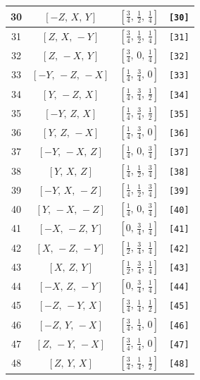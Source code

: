 \documentclass[fleqn,8pt]{jsarticle}
\begin{document}
\begin{longtable}{cccc}
30 & $\left[ - Z,\, X,\, Y \right]$ & $\left[ \frac{3}{4},\, \frac{1}{2},\, \frac{1}{4} \right]$ & {\tt [30]} \\ \hline
31 & $\left[ Z,\, X,\, - Y \right]$ & $\left[ \frac{3}{4},\, \frac{1}{2},\, \frac{1}{4} \right]$ & {\tt [31]} \\ \hline
32 & $\left[ Z,\, - X,\, Y \right]$ & $\left[ \frac{3}{4},\, 0,\, \frac{1}{4} \right]$ & {\tt [32]} \\ \hline
33 & $\left[ - Y,\, - Z,\, - X \right]$ & $\left[ \frac{1}{4},\, \frac{3}{4},\, 0 \right]$ & {\tt [33]} \\ \hline
34 & $\left[ Y,\, - Z,\, X \right]$ & $\left[ \frac{1}{4},\, \frac{3}{4},\, \frac{1}{2} \right]$ & {\tt [34]} \\ \hline
35 & $\left[ - Y,\, Z,\, X \right]$ & $\left[ \frac{1}{4},\, \frac{3}{4},\, \frac{1}{2} \right]$ & {\tt [35]} \\ \hline
36 & $\left[ Y,\, Z,\, - X \right]$ & $\left[ \frac{1}{4},\, \frac{3}{4},\, 0 \right]$ & {\tt [36]} \\ \hline
37 & $\left[ - Y,\, - X,\, Z \right]$ & $\left[ \frac{1}{4},\, 0,\, \frac{3}{4} \right]$ & {\tt [37]} \\ \hline
38 & $\left[ Y,\, X,\, Z \right]$ & $\left[ \frac{1}{4},\, \frac{1}{2},\, \frac{3}{4} \right]$ & {\tt [38]} \\ \hline
39 & $\left[ - Y,\, X,\, - Z \right]$ & $\left[ \frac{1}{4},\, \frac{1}{2},\, \frac{3}{4} \right]$ & {\tt [39]} \\ \hline
40 & $\left[ Y,\, - X,\, - Z \right]$ & $\left[ \frac{1}{4},\, 0,\, \frac{3}{4} \right]$ & {\tt [40]} \\ \hline
41 & $\left[ - X,\, - Z,\, Y \right]$ & $\left[ 0,\, \frac{3}{4},\, \frac{1}{4} \right]$ & {\tt [41]} \\ \hline
42 & $\left[ X,\, - Z,\, - Y \right]$ & $\left[ \frac{1}{2},\, \frac{3}{4},\, \frac{1}{4} \right]$ & {\tt [42]} \\ \hline
43 & $\left[ X,\, Z,\, Y \right]$ & $\left[ \frac{1}{2},\, \frac{3}{4},\, \frac{1}{4} \right]$ & {\tt [43]} \\ \hline
44 & $\left[ - X,\, Z,\, - Y \right]$ & $\left[ 0,\, \frac{3}{4},\, \frac{1}{4} \right]$ & {\tt [44]} \\ \hline
45 & $\left[ - Z,\, - Y,\, X \right]$ & $\left[ \frac{3}{4},\, \frac{1}{4},\, \frac{1}{2} \right]$ & {\tt [45]} \\ \hline
46 & $\left[ - Z,\, Y,\, - X \right]$ & $\left[ \frac{3}{4},\, \frac{1}{4},\, 0 \right]$ & {\tt [46]} \\ \hline
47 & $\left[ Z,\, - Y,\, - X \right]$ & $\left[ \frac{3}{4},\, \frac{1}{4},\, 0 \right]$ & {\tt [47]} \\ \hline
48 & $\left[ Z,\, Y,\, X \right]$ & $\left[ \frac{3}{4},\, \frac{1}{4},\, \frac{1}{2} \right]$ & {\tt [48]} \\
\end{longtable}
\end{document}
